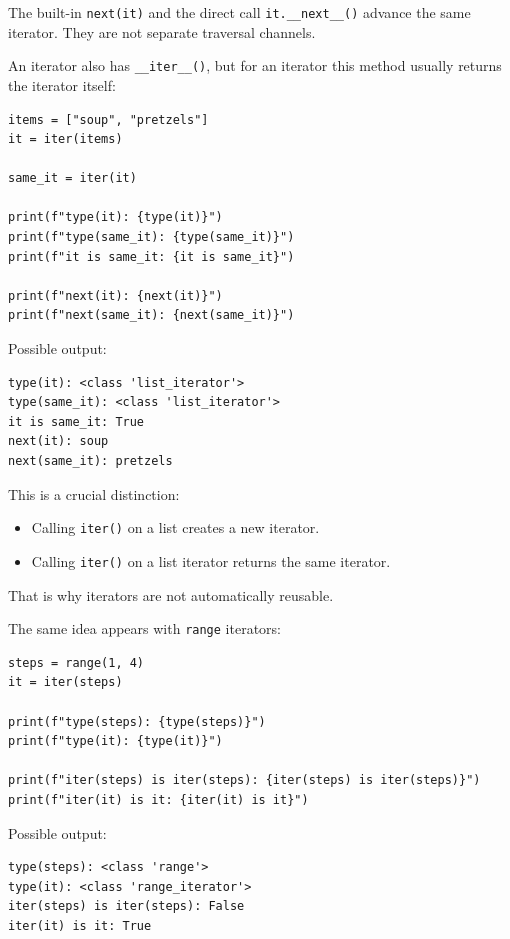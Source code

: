 The built-in \texttt{next(it)} and the direct call \texttt{it.\_\_next\_\_()} advance the same iterator. They are not separate traversal channels.

An iterator also has \texttt{\_\_iter\_\_()}, but for an iterator this method usually returns the iterator itself:

\begin{verbatim}
items = ["soup", "pretzels"]
it = iter(items)

same_it = iter(it)

print(f"type(it): {type(it)}")
print(f"type(same_it): {type(same_it)}")
print(f"it is same_it: {it is same_it}")

print(f"next(it): {next(it)}")
print(f"next(same_it): {next(same_it)}")
\end{verbatim}

Possible output:

\begin{verbatim}
type(it): <class 'list_iterator'>
type(same_it): <class 'list_iterator'>
it is same_it: True
next(it): soup
next(same_it): pretzels
\end{verbatim}

This is a crucial distinction:

\begin{itemize}
    \item Calling \texttt{iter()} on a list creates a new iterator.
    \item Calling \texttt{iter()} on a list iterator returns the same iterator.
\end{itemize}

That is why iterators are not automatically reusable.

The same idea appears with \texttt{range} iterators:

\begin{verbatim}
steps = range(1, 4)
it = iter(steps)

print(f"type(steps): {type(steps)}")
print(f"type(it): {type(it)}")

print(f"iter(steps) is iter(steps): {iter(steps) is iter(steps)}")
print(f"iter(it) is it: {iter(it) is it}")
\end{verbatim}

Possible output:

\begin{verbatim}
type(steps): <class 'range'>
type(it): <class 'range_iterator'>
iter(steps) is iter(steps): False
iter(it) is it: True
\end{verbatim}

